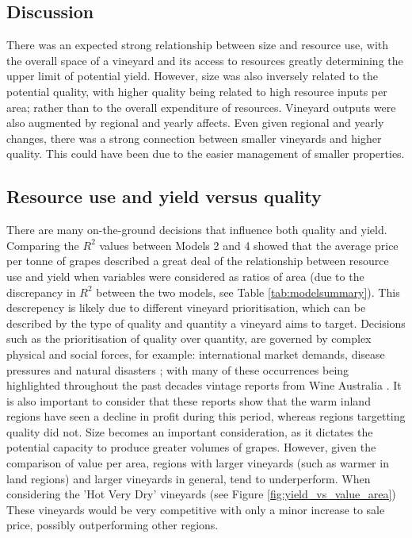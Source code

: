 \documentclass[review,12pt,authoryear]{elsarticle}
\begin{document}
\begin{linenumbers}
\section{Discussion}
There was an expected strong relationship between size and resource use, with the overall space of a vineyard and its access to resources greatly determining the upper limit of potential yield. However, size was also inversely related to the potential quality, with higher quality being related to high resource inputs per area; rather than to the overall expenditure of resources. Vineyard outputs were also augmented by regional and yearly affects. Even given regional and yearly changes, there was a strong connection between smaller vineyards and higher quality. This could have been due to the easier management of smaller properties.
\subsection{Resource use and yield versus quality} 
 There are many on-the-ground decisions that influence both quality and yield. Comparing the $R^2$ values between Models 2 and 4 showed that the average price per tonne of grapes described a great deal of the relationship between resource use and yield when variables were considered as ratios of area (due to the discrepancy in $R^2$ between the two models, see Table \ref{tab:modelsummary}). This descrepency is likely due to different vineyard prioritisation, which can be described by the type of quality and quantity a vineyard aims to target. Decisions such as the prioritisation of quality over quantity, are governed by complex physical and social forces, for example: international market demands, disease pressures and natural disasters \citep{abadCoverCropsViticulture2021,cortezUsingDataMining2009,hallWithinseasonTemporalVariation2011,i.goodwinManagingSoilWater2009,kasimatiPredictingGrapeSugar2022,oliverReviewSoilPhysical2013,srivastavaNondestructiveSensingMethods2018}; with many of these occurrences being highlighted throughout the past decades vintage reports from Wine Australia \citep{wineaustraliaNationalVintageReport2019,wineaustraliaNationalVintageReport2021,wineaustraliaNationalVintageReport2022,winemakersfederationofaustraliaNationalVintageReport2013,winemakersfederationofaustraliaNationalVintageReport2014,winemakersfederationofaustraliaNationalVintageReport2015,winemakersfederationofaustraliaNationalVintageReport2016,winemakersfederationofaustraliaNationalVintageReport2017,winemakersfederationofaustraliaNationalVintageReport2018}. It is also important to consider that these reports show that the warm inland regions have seen a decline in profit during this period, whereas regions targetting quality did not. Size becomes an important consideration, as it dictates the potential capacity to produce greater volumes of grapes. However, given the comparison of value per area, regions with larger vineyards (such as warmer in land regions) and larger vineyards in general, tend to underperform. When considering the 'Hot Very Dry' vineyards (see Figure \ref{fig:yield_vs_value_area}) These vineyards would be very competitive with only a minor increase to sale price, possibly outperforming other regions.

\end{linenumbers}
\end{document}
